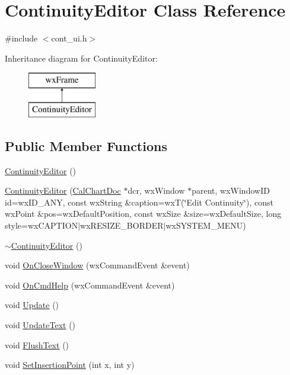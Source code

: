 \hypertarget{a00059}{\section{Continuity\-Editor Class Reference}
\label{a00059}
}


{\ttfamily \#include $<$cont\-\_\-ui.\-h$>$}

Inheritance diagram for Continuity\-Editor\-:\begin{figure}[H]
\begin{center}
\leavevmode
\includegraphics[height=2.000000cm]{a00059}
\end{center}
\end{figure}
\subsection*{Public Member Functions}
\begin{DoxyCompactItemize}
\item 
\hyperlink{a00059_a9e31a8ab139a1b747297d57c7a49c2cc}{Continuity\-Editor} ()
\item 
\hyperlink{a00059_ad60b959f500e59ff49bd1c5b848b5ba5}{Continuity\-Editor} (\hyperlink{a00020}{Cal\-Chart\-Doc} $\ast$dcr, wx\-Window $\ast$parent, wx\-Window\-I\-D id=wx\-I\-D\-\_\-\-A\-N\-Y, const wx\-String \&caption=wx\-T(\char`\"{}Edit Continuity\char`\"{}), const wx\-Point \&pos=wx\-Default\-Position, const wx\-Size \&size=wx\-Default\-Size, long style=wx\-C\-A\-P\-T\-I\-O\-N$\vert$wx\-R\-E\-S\-I\-Z\-E\-\_\-\-B\-O\-R\-D\-E\-R$\vert$wx\-S\-Y\-S\-T\-E\-M\-\_\-\-M\-E\-N\-U)
\item 
\hyperlink{a00059_a3aedb1177617586468e9060f4a4f61bd}{$\sim$\-Continuity\-Editor} ()
\item 
void \hyperlink{a00059_ae6b1600a094778ea4cad6ec5762d8ccf}{On\-Close\-Window} (wx\-Command\-Event \&event)
\item 
void \hyperlink{a00059_a246d7c68af529d577fc454a02500bec6}{On\-Cmd\-Help} (wx\-Command\-Event \&event)
\item 
void \hyperlink{a00059_aa15472d864ce0b5d3be618ae239a85f4}{Update} ()
\item 
void \hyperlink{a00059_adf2bf1ae2342f2ad0f8232c945224865}{Update\-Text} ()
\item 
void \hyperlink{a00059_aa464eca3687ea58cd2e4accec5b6eb1a}{Flush\-Text} ()
\item 
void \hyperlink{a00059_a4ec0afdacc48ad2c794562857f69f803}{Set\-Insertion\-Point} (int x, int y)
\end{DoxyCompactItemize}
